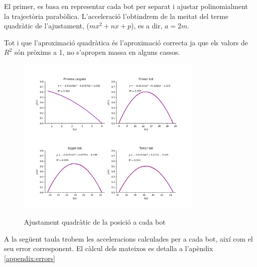 \documentclass[11pt]{article}
\begin{document}
    \vspace{0.4cm}El primer, es basa en representar cada bot per separat i ajustar polinomialment la trajectòria parabòlica. L'acceleració l'obtindrem de la meitat del terme quadràtic de l'ajustament, ($mx^2+nx+p$), es a dir, $a=2m$. 

    \clearpage
    
    Tot i que l'aproximació quadràtica és l'aproximació correcta ja que els valors de $R^2$ són pròxims a 1, no s'apropen massa en alguns cassos.

    \begin{figure}[h]
        \vspace{-0.2cm}
        \begin{center}
            \includegraphics[width=0.8\textwidth]{fotos/4graph.png}
            \label{fig:4graf}
            \caption{Ajustament quadràtic de la posició a cada bot}
        \end{center}
    \end{figure}

    \vspace{0.4cm}A la següent taula trobem les acceleracions calculades per a cada bot, així com el seu error corresponent. El càlcul dels mateixos es detalla a l'apèndix \ref{appendix:errors}
    
\end{document}
